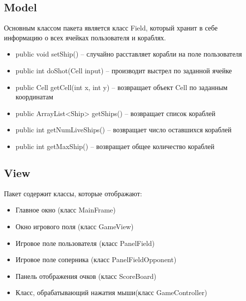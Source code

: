 \documentclass{article}
\begin{document}
			\subsection{Model}
				Основным классом пакета является класс Field, который хранит в себе информацию о всех ячейках пользователя и кораблях.
				\begin{itemize}
					\item {public void setShip() -- случайно расставляет корабли на поле пользователя}
					\item {public int doShot(Cell input) -- производит выстрел по заданной ячейке}
					\item {public Cell getCell(int x, int y) -- возвращает объект Cell по заданным координатам}
					\item{public ArrayList<Ship> getShips() -- возвращает список кораблей}
					\item{public int getNumLiveShips() -- возвращает число оставшихся кораблей}
					\item {public int getMaxShip() -- возвращает общее количество кораблей}
				\end{itemize}
			\subsection{View}
				Пакет содержит классы, которые отображают:
				\begin{itemize}
					\item {Главное окно (класс MainFrame)}
					\item {Окно игрового поля (класс GameView)}
					\item {Игровое поле пользователя (класс PanelField)}
					\item {Игровое поле соперника (класс PanelFieldOpponent)}
					\item {Панель отображения очков (класс ScoreBoard)}
					\item {Класс, обрабатывающий нажатия мыши(класс GameController)}
				\end{itemize}
\end{document}
